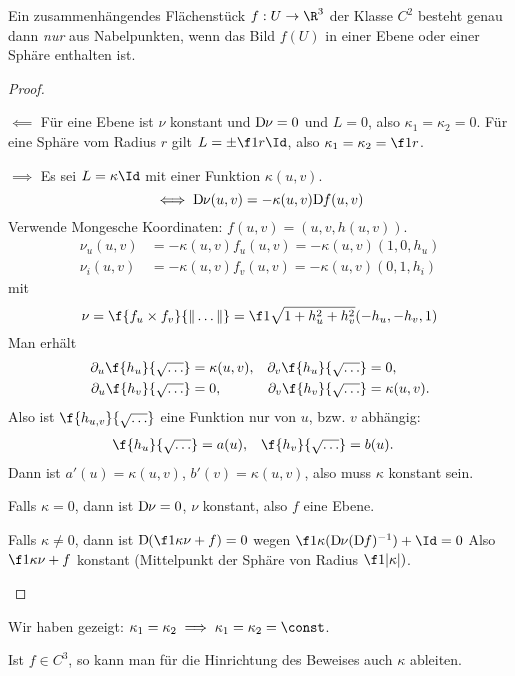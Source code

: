 \begin{st}
	Ein zusammenhängendes Flächenstück $f: U \to \R^3$ der Klasse $C^2$ besteht genau dann \emph{nur} aus Nabelpunkten, wenn das Bild $f(U)$ in einer Ebene oder einer Sphäre enthalten ist.
	\begin{proof}
		\begin{seg}{$\impliedby$}
			Für eine Ebene ist $\nu$ konstant und $\Df[\nu] = 0$ und $L = 0$, also $\kappa_1 = \kappa_2 = 0$.
			Für eine Sphäre vom Radius $r$ gilt $L = \pm \f 1r \Id$, also $\kappa_1 = \kappa_2 = \f 1r$.
		\end{seg}
		\begin{seg}{$\implies$}
			Es sei $L = \kappa \Id$ mit einer Funktion $\kappa(u, v)$.
			\[
				\iff \Df[\nu](u,v) = - \kappa(u,v) \Df (u,v)
			\]
			Verwende Mongesche Koordinaten: $f(u, v) = (u,v,h(u,v))$.
			\begin{align*}
				\nu_u(u,v) &= -\kappa(u,v) f_u(u, v)
				= -\kappa(u,v)
				(1, 0, h_u) \\
				\nu_i (u,v) &= -\kappa(u,v) f_v(u, v)
				= -\kappa(u,v)
				(0, 1, h_i)
			\end{align*}
			mit
			\[
				\nu = \f {f_u \times f_v}{\|\dotsc\|} = \f 1{\sqrt{1 + h_u^2 + h_v^2}} (-h_u, -h_v, 1)
			\]
			Man erhält
			\begin{align*}
				\partial_u \f {h_u}{\sqrt{\dotsc}}
				&= \kappa(u,v), &
				\partial_v \f {h_u}{\sqrt{\dotsc}}
				&= 0, \\
				\partial_u \f {h_v}{\sqrt{\dotsc}}
				&= 0, &
				\partial_v \f {h_v}{\sqrt{\dotsc}}
				&= \kappa(u,v).
			\end{align*}
			Also ist $\f{h_{u,v}}{\sqrt{\dotsc}}$ eine Funktion nur von $u$, bzw. $v$ abhängig:
			\begin{align*}
				\f{h_u}{\sqrt{\dotsc}} &= a(u), &
				\f{h_v}{\sqrt{\dotsc}} &= b(u).
			\end{align*}
			Dann ist $a'(u) = \kappa(u,v)$, $b'(v) = \kappa(u,v)$, also muss $\kappa$ konstant sein.

			Falls $\kappa = 0$, dann ist $\Df[\nu] = 0$, $\nu$ konstant, also $f$ eine Ebene.

			Falls $\kappa \neq 0$, dann ist $\Df[(\f 1\kappa \nu + f)] = 0$ wegen $\f 1\kappa (\Df[\nu] (\Df)^{-1}) + \Id = 0$
			Also $\f 1\kappa \nu + f$ konstant (Mittelpunkt der Sphäre von Radius $\f 1{|\kappa|})$.
		\end{seg}
	\end{proof}
	\begin{note}
		Wir haben gezeigt: $\kappa_1 = \kappa_2 \implies \kappa_1 = \kappa_2 = \const$.

		Ist $f \in C^3$, so kann man für die Hinrichtung des Beweises auch $\kappa$ ableiten.
	\end{note}
\end{st}










